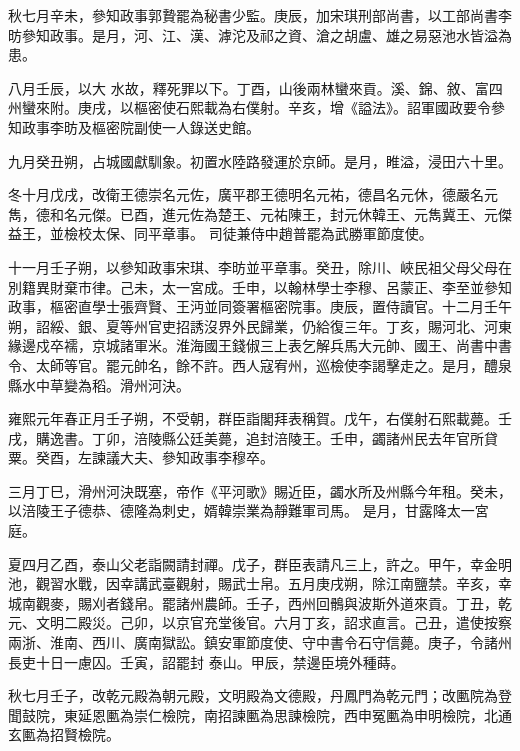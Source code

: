 \begin{pinyinscope}
 秋七月辛未，參知政事郭贄罷為秘書少監。庚辰，加宋琪刑部尚書，以工部尚書李昉參知政事。是月，河、江、漢、滹沱及祁之資、滄之胡盧、雄之易惡池水皆溢為患。



 八月壬辰，以大
 水故，釋死罪以下。丁酉，山後兩林蠻來貢。溪、錦、敘、富四州蠻來附。庚戌，以樞密使石熙載為右僕射。辛亥，增《謚法》。詔軍國政要令參知政事李昉及樞密院副使一人錄送史館。



 九月癸丑朔，占城國獻馴象。初置水陸路發運於京師。是月，睢溢，浸田六十里。



 冬十月戊戌，改衛王德崇名元佐，廣平郡王德明名元祐，德昌名元休，德嚴名元雋，德和名元傑。已酉，進元佐為楚王、元祐陳王，封元休韓王、元雋冀王、元傑益王，並檢校太保、同平章事。
 司徒兼侍中趙普罷為武勝軍節度使。



 十一月壬子朔，以參知政事宋琪、李昉並平章事。癸丑，除川、峽民祖父母父母在別籍異財棄市律。己未，太一宮成。壬申，以翰林學士李穆、呂蒙正、李至並參知政事，樞密直學士張齊賢、王沔並同簽署樞密院事。庚辰，置侍讀官。十二月壬午朔，詔綏、銀、夏等州官吏招誘沒界外民歸業，仍給復三年。丁亥，賜河北、河東緣邊戍卒襦，京城諸軍米。淮海國王錢俶三上表乞解兵馬大元帥、國王、尚書中書
 令、太師等官。罷元帥名，餘不許。西人寇宥州，巡檢使李謁擊走之。是月，醴泉縣水中草變為稻。滑州河決。



 雍熙元年春正月壬子朔，不受朝，群臣詣閣拜表稱賀。戊午，右僕射石熙載薨。壬戌，購逸書。丁卯，涪陵縣公廷美薨，追封涪陵王。壬申，蠲諸州民去年官所貸粟。癸酉，左諫議大夫、參知政事李穆卒。



 三月丁巳，滑州河決既塞，帝作《平河歌》賜近臣，蠲水所及州縣今年租。癸未，以涪陵王子德恭、德隆為刺史，婿韓崇業為靜難軍司馬。
 是月，甘露降太一宮庭。



 夏四月乙酉，泰山父老詣闕請封禪。戊子，群臣表請凡三上，許之。甲午，幸金明池，觀習水戰，因幸講武臺觀射，賜武士帛。五月庚戌朔，除江南鹽禁。辛亥，幸城南觀麥，賜刈者錢帛。罷諸州農師。壬子，西州回鶻與波斯外道來貢。丁丑，乾元、文明二殿災。己卯，以京官充堂後官。六月丁亥，詔求直言。己丑，遣使按察兩浙、淮南、西川、廣南獄訟。鎮安軍節度使、守中書令石守信薨。庚子，令諸州長吏十日一慮囚。壬寅，詔罷封
 泰山。甲辰，禁邊臣境外種蒔。



 秋七月壬子，改乾元殿為朝元殿，文明殿為文德殿，丹鳳門為乾元門；改匭院為登聞鼓院，東延恩匭為崇仁檢院，南招諫匭為思諫檢院，西申冤匭為申明檢院，北通玄匭為招賢檢院。




\end{pinyinscope}
